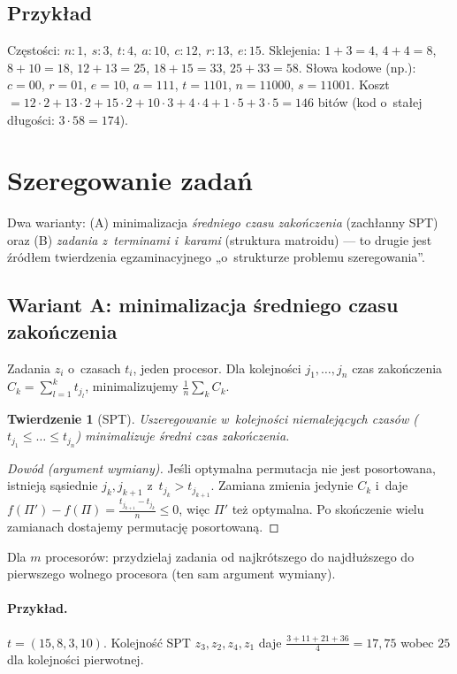 \documentclass[11pt,a4paper]{article}
\theoremstyle{plain}
\newtheorem{twierdzenie}{Twierdzenie}[section]
\theoremstyle{definition}
\begin{document}
\subsection*{Przykład}
Częstości: $n{:}1,\ s{:}3,\ t{:}4,\ a{:}10,\ c{:}12,\ r{:}13,\ e{:}15$. Sklejenia:
$1{+}3{=}4$, $4{+}4{=}8$, $8{+}10{=}18$, $12{+}13{=}25$, $18{+}15{=}33$, $25{+}33{=}58$.
Słowa kodowe (np.): $c{=}00$, $r{=}01$, $e{=}10$, $a{=}111$, $t{=}1101$, $n{=}11000$, $s{=}11001$.
Koszt $=12{\cdot}2+13{\cdot}2+15{\cdot}2+10{\cdot}3+4{\cdot}4+1{\cdot}5+3{\cdot}5=146$ bitów (kod o~stałej
długości: $3\cdot58=174$).

\section{Szeregowanie zadań}\label{sec:sched}
Dwa warianty: (A) minimalizacja \emph{średniego czasu zakończenia} (zachłanny SPT) oraz
(B) \emph{zadania z~terminami i~karami} (struktura matroidu) --- to drugie jest źródłem twierdzenia
egzaminacyjnego „o~strukturze problemu szeregowania''.

\subsection{Wariant A: minimalizacja średniego czasu zakończenia}
Zadania $z_i$ o~czasach $t_i$, jeden procesor. Dla kolejności $j_1,\dots,j_n$ czas zakończenia
$C_k=\sum_{l=1}^k t_{j_l}$, minimalizujemy $\frac1n\sum_k C_k$.
\begin{twierdzenie}[SPT]\label{tw:spt}
Uszeregowanie w~kolejności niemalejących czasów ($t_{j_1}\le\dots\le t_{j_n}$) minimalizuje średni czas
zakończenia.
\end{twierdzenie}
\begin{proof}[Dowód (argument wymiany)]
Jeśli optymalna permutacja nie jest posortowana, istnieją sąsiednie $j_k,j_{k+1}$ z~$t_{j_k}>t_{j_{k+1}}$.
Zamiana zmienia jedynie $C_k$ i~daje $f(\Pi')-f(\Pi)=\frac{t_{j_{k+1}}-t_{j_k}}{n}\le0$, więc $\Pi'$ też
optymalna. Po skończenie wielu zamianach dostajemy permutację posortowaną.
\end{proof}
Dla $m$ procesorów: przydzielaj zadania od najkrótszego do najdłuższego do pierwszego wolnego procesora
(ten sam argument wymiany).

\paragraph{Przykład.} $t=(15,8,3,10)$. Kolejność SPT $z_3,z_2,z_4,z_1$ daje
$\tfrac{3+11+21+36}{4}=17{,}75$ wobec $25$ dla kolejności pierwotnej.
\end{document}
